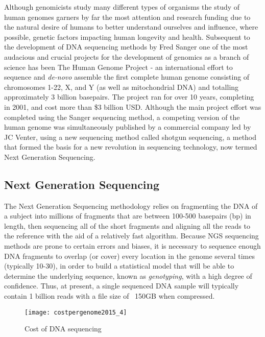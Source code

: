 Although genomicists study many different types of organisms the study of human genomes garners by far the most attention and research funding due to the natural desire of humans to better understand ourselves and influence, where possible, genetic factors impacting human longevity and health. Subsequent to the development of DNA sequencing methods by Fred Sanger one of the most audacious and crucial projects for the development of genomics as a branch of science has been The Human Genome Project\autocite{lander2001initial} - an international effort to sequence and \emph{de-novo} assemble the first complete human genome consisting of chromosomes 1-22, X, and Y (as well as mitochondrial DNA) and totalling approximately 3 billion basepairs. The project ran for over 10 years, completing in 2001, and cost more than \$3 billion USD. Although the main project effort was completed using the Sanger sequencing method, a competing version of the human genome was simultaneously published by a commercial company led by JC Venter\autocite{venter2001sequence}, using a new sequencing method called shotgun sequencing\autocite{venter1998shotgun}, a method that formed the basis for a new revolution in sequencing technology, now termed Next Generation Sequencing\autocite{schuster2007next}.

\subsection{Next Generation Sequencing}
The Next Generation Sequencing methodology\autocite{mardis2008next} relies on fragmenting the DNA of a subject into millions of fragments that are between 100-500 basepairs (bp) in length, then sequencing all of the short fragments and aligning all the reads to the reference with the aid of a relatively fast algorithm\autocite{li2010survey}. Because NGS sequencing methods are prone to certain errors and biases\autocite{dohm2008substantial}, it is necessary to sequence enough DNA fragments to overlap (or cover) every location in the genome several times (typically 10-30), in order to build a statistical model that will be able to determine the underlying sequence, known as \emph{genotyping}\autocite{nielsen2011genotype}, with a high degree of confidence. Thus, at present, a single sequenced DNA sample will typically contain 1 billion reads with a file size of ~150GB when compressed.

\begin{figure}[H]
\texttt{[image: costpergenome2015\_4]}
\centering
\caption {Cost of DNA sequencing\autocite{The_Cost_of_Sequencing_a_Human_Genome_2016-11-04}}
\label{fig:costpergenome2015_4}
\end{figure}

